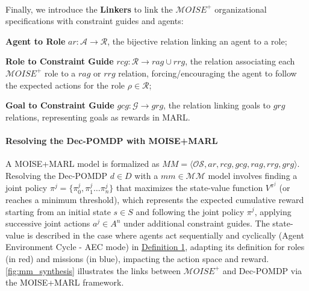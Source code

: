\documentclass[pdflatex,sn-mathphys-num]{sn-jnl}%
\theoremstyle{thmstyleone}%
\theoremstyle{thmstyletwo}%
\theoremstyle{thmstylethree}%
\begin{document}
\

\noindent Finally, we introduce the \textbf{Linkers} to link the $\mathcal{M}OISE^+$ organizational specifications with constraint guides and agents:
%
\begin{enumerate*}[label={\roman*) },itemjoin={; \quad}]
    
    \item \textbf{Agent to Role} \quad $ar: \mathcal{A} \to \mathcal{R}$, the bijective relation linking an agent to a role;
    \item \textbf{Role to Constraint Guide} \quad $rcg: \mathcal{R} \rightarrow rag \cup rrg$, the relation associating each $\mathcal{M}OISE^+$ role to a $rag$ or $rrg$ relation, forcing/encouraging the agent to follow the expected actions for the role $\rho \in \mathcal{R}$;
    \item \textbf{Goal to Constraint Guide} \quad $gcg: \mathcal{G} \rightarrow grg$, the relation linking goals to $grg$ relations, representing goals as rewards in MARL.
\end{enumerate*}

\paragraph{\textbf{Resolving the Dec-POMDP with MOISE+MARL}}

A MOISE+MARL model is formalized as $MM = \langle \mathcal{OS}, ar, rcg, gcg, rag, rrg, grg\rangle$.
Resolving the Dec-POMDP $d \in D$ with a $mm \in \mathcal{MM}$ model involves finding a joint policy $\pi^{j} = \{\pi^j_0,\pi^j_1\dots\pi^j_n\}$ that maximizes the state-value function $V^{\pi^{j}}$ (or reaches a minimum threshold), which represents the expected cumulative reward starting from an initial state $s \in S$ and following the joint policy $\pi^{j}$, applying successive joint actions $a^{j} \in A^n$ under additional constraint guides. The state-value is described in the case where agents act sequentially and cyclically (Agent Environment Cycle - AEC mode) in \hyperref[eq:single_value_function]{Definition 1}, adapting its definition for roles (in red) and missions (in blue), impacting the action space and reward. \autoref{fig:mm_synthesis} illustrates the links between $\mathcal{M}OISE^+$ and Dec-POMDP via the MOISE+MARL framework.
\end{document}
